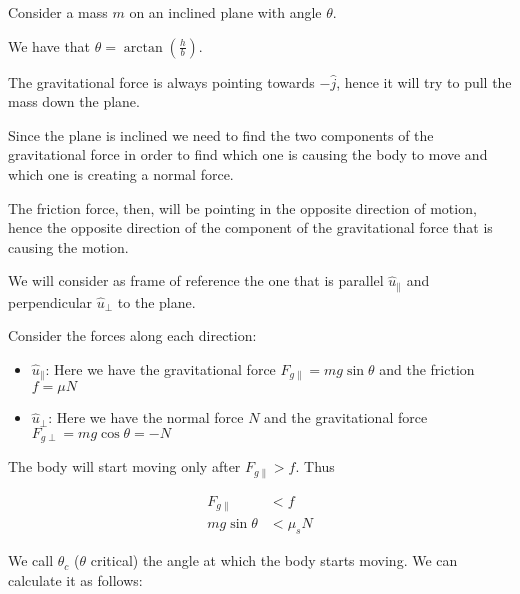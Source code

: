 \documentclass[10pt]{extarticle}
\begin{document}
\begin{center}
\end{center}

Consider a mass $m$ on an inclined plane with angle $\theta$.

We have that $\theta = \arctan\left(\frac{h}{b}\right)$.

The gravitational force is always pointing towards $-\hat j$, hence it will try to pull the mass down the plane.

Since the plane is inclined we need to find the two components of the gravitational force in order to find which one is causing the body to move and which one is creating a normal force.

The friction force, then, will be pointing in the opposite direction of motion, hence the opposite direction of the component of the gravitational force that is causing the motion.

We will consider as frame of reference the one that is parallel $\hat u_{\parallel}$ and perpendicular $\hat u_{\perp}$ to the plane.

Consider the forces along each direction:

\begin{itemize}
  \item $\hat u_{\parallel}$:
        Here we have the gravitational force $F_{g\parallel} = mg \sin \theta$ and the friction $f = \mu N$
  \item $\hat u_{\perp}$: Here we have the normal force $N$ and the gravitational force $F_{g\perp} = mg \cos \theta = - N$
\end{itemize}

The body will start moving only after $F_{g\parallel} > f$. Thus

\begin{align*}
  F_{g\parallel} & < f       \\
  mg \sin \theta & < \mu_s N
\end{align*}

We call $\theta_c$ ($\theta$ critical) the angle at which the body starts moving. We can calculate it as follows:
\end{document}
